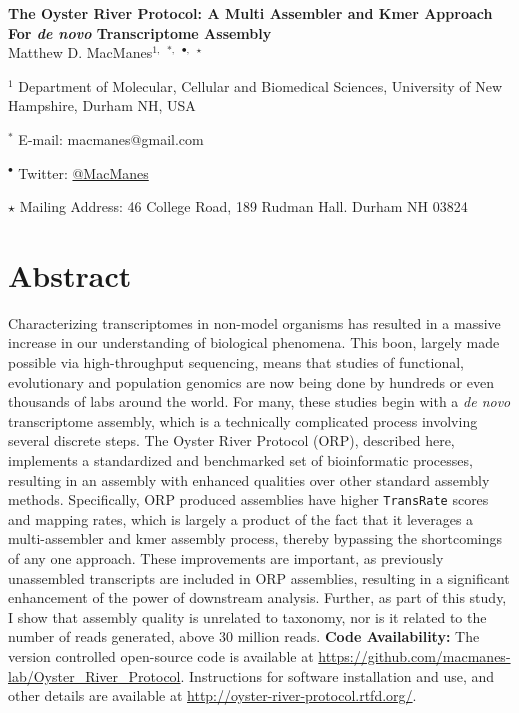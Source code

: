 \documentclass[10pt,letterpaper]{article}
\date{}
\begin{document}
\vspace*{0.35in}


\begin{flushleft}

{\Large
\textbf{The Oyster River Protocol: A Multi Assembler and Kmer Approach For \textit{de novo} Transcriptome Assembly }}
\\
Matthew D. MacManes$^{1,}$ $^{\ast,}$ $^{\bullet,}$ $^\star$

$^{1}$ Department of Molecular, Cellular and Biomedical Sciences, University of New Hampshire, Durham NH, USA

$^\ast$ E-mail: macmanes@gmail.com

$^\bullet$ Twitter: \href{http://twitter.com/macmanes}{@MacManes}

$\star$ Mailing Address: 46 College Road, 189 Rudman Hall. Durham NH 03824
\end{flushleft}


\newpage

\linenumbers

\section*{Abstract}

Characterizing transcriptomes in non-model organisms has resulted in a massive increase in our understanding of biological phenomena. This boon, largely made possible via high-throughput sequencing, means that studies of functional, evolutionary and population genomics are now being done by hundreds or even thousands of labs around the world. For many, these studies begin with a \textit{de novo} transcriptome assembly, which is a technically complicated process involving several discrete steps. The Oyster River Protocol (ORP), described here, implements a standardized and benchmarked set of bioinformatic processes, resulting in an assembly with enhanced qualities over other standard assembly methods. Specifically, ORP produced assemblies have higher \texttt{TransRate} scores and mapping rates, which is largely a product of the fact that it leverages a multi-assembler and kmer assembly process, thereby bypassing the shortcomings of any one approach. These improvements are important, as previously unassembled transcripts are included in ORP assemblies, resulting in a significant enhancement of the power of downstream analysis. Further, as part of this study, I show that assembly quality is unrelated to taxonomy, nor is it related to the number of reads generated, above 30 million reads.  \textbf{Code Availability:} The version controlled open-source code is available at \url{https://github.com/macmanes-lab/Oyster_River_Protocol}.  Instructions for software installation and use, and other details are available at \url{http://oyster-river-protocol.rtfd.org/}.
\end{document}
